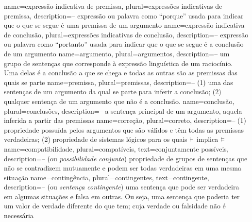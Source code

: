 

\makeglossaries



{
 name=expressão indicativa de premissa,
 plural=expressões indicativas de premissa,
 description={-- expressão ou palavra como ``porque'' usada para indicar que o que se segue é uma premissa de um argumento}
}
{
name=expressão indicativa de conclusão,
plural=expressões indicativas de conclusão,
description={-- expressão ou palavra como ``portanto'' usada para indicar que o que se segue é a conclusão de um argumento}
}
{
name=argumento,
plural=argumentos,
description={-- um grupo de sentenças que corresponde à expressão linguística de um raciocínio. Uma delas é a conclusão a que se chega e todas as outras são as premissas das quais se parte}
}
{
name=premissa,
plural=premissas,
description={-- (1) uma das sentenças de um argumento da qual se parte para inferir a conclusão; (2) qualquer sentença de um argumento que não é a conclusão.}
}
{
name=conclusão,
plural=conclusões,
description={-- a sentença principal de um argumento, aquela inferida a partir das premissas}
}
{
name=correção,
plural=correto,
description={-- (1) propriedade possuída pelos argumentos que são válidos e têm todas as premissas verdadeiras; (2) propriedade de sistemas lógicos para os quais $\vdash$ implica $\vDash$}
}
{
name=compatibilidade,
plural=compatíveis,
text={conjuntamente possíveis}, %
description={-- (ou \textit{possibilidade conjunta}) propriedade de grupos de sentenças que não se contradizem mutuamente e podem ser todas verdadeiras em uma mesma situação}
}
{
name=contingência,
plural=contingentes,
text=contingente,
description={-- (ou \textit{sentença contingente}) uma sentença que pode ser verdadeira em algumas situações e falsa em outras. Ou seja, uma sentença que poderia ter um valor de verdade diferente do que tem; cuja verdade ou falsidade não é necessária}
}
